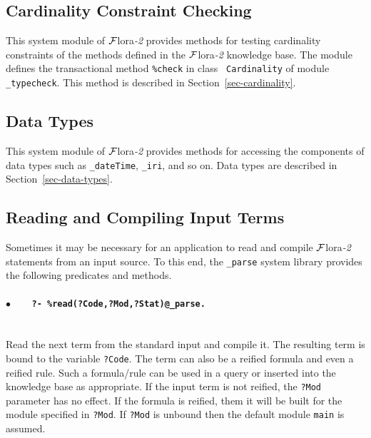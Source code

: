 \documentclass[11pt]{article}
\newcommand{\FLORA}{{\mbox{\sc ${\cal F}${lora}\rm\emph{-2}}}\xspace}
\begin{document}
\subsection{Cardinality Constraint Checking}\label{sec-type-sysmod}

This system module of \FLORA provides methods for testing cardinality
constraints of the methods defined in the \FLORA knowledge base.  The
module defines the transactional method {\tt \%check} in class {\tt
  Cardinality} of module {\tt \_typecheck}.  This method is described in
Section~\ref{sec-cardinality}.

\subsection{Data Types}\label{sec-data-types-sysmod}

This system module of \FLORA provides methods for accessing the components
of data types such as {\tt \_dateTime}, {\tt \_iri}, and so on.
Data types are described in Section~\ref{sec-data-types}.

\subsection{Reading and Compiling Input Terms}\label{sec-parse-compile}

Sometimes it may be necessary for an application to read and compile \FLORA
statements from an input source. To this end, the {\tt \_parse} 
system library provides the following predicates and methods.
\paragraph{$\bullet$~~~ \tt ?- \%read(?Code,?Mod,?Stat)@\_parse.} ~~\\
Read the next term from the standard input and compile it. The resulting
term is bound to the variable {\tt ?Code}.  The term can also be a reified
formula and even a reified rule.  Such a formula/rule can be used in a
query or inserted into the knowledge base as appropriate. If the input term
is not reified, the {\tt ?Mod} parameter has no effect. If the formula is
reified, them it will be built for the module specified in {\tt ?Mod}. If
{\tt ?Mod} is unbound then the default module {\tt main} is assumed.
\end{document}
